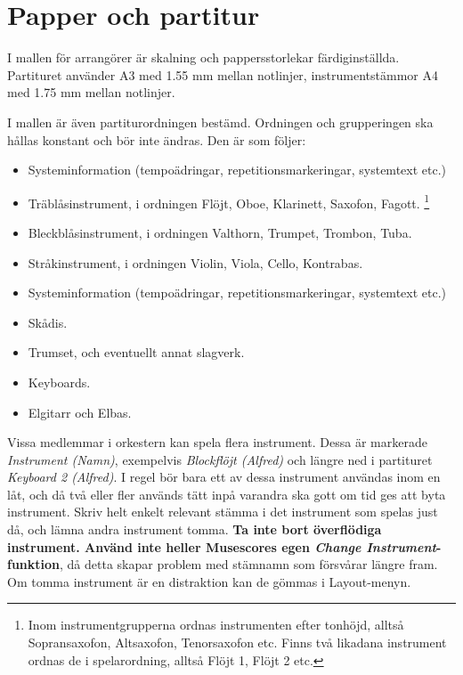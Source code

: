 \newpage
\section{Papper och partitur}
I mallen för arrangörer är skalning och pappersstorlekar färdiginställda. Partituret använder A3 med 1.55 mm mellan notlinjer, instrumentstämmor A4 med 1.75 mm mellan notlinjer. 

I mallen är även partiturordningen bestämd. Ordningen och grupperingen ska hållas konstant och bör inte ändras. Den är som följer:
\begin{itemize}
    \item Systeminformation (tempoädringar, repetitionsmarkeringar, systemtext etc.)
    \item Träblåsinstrument, i ordningen Flöjt, Oboe, Klarinett, Saxofon, Fagott. \footnote{\label{inom}Inom instrumentgrupperna ordnas instrumenten efter tonhöjd, alltså Sopransaxofon, Altsaxofon, Tenorsaxofon etc. Finns två likadana instrument ordnas de i spelarordning, alltså Flöjt 1, Flöjt 2 etc.}
    \item Bleckblåsinstrument, i ordningen Valthorn, Trumpet, Trombon, Tuba. 
    \item Stråkinstrument, i ordningen Violin, Viola, Cello, Kontrabas. 
    \item Systeminformation (tempoädringar, repetitionsmarkeringar, systemtext etc.)
    \item Skådis.
    \item Trumset, och eventuellt annat slagverk.
    \item Keyboards.
    \item Elgitarr och Elbas.
\end{itemize}

Vissa medlemmar i orkestern kan spela flera instrument. Dessa är markerade \textit{Instrument (Namn)}, exempelvis \textit{Blockflöjt (Alfred)} och längre ned i partituret \textit{Keyboard 2 (Alfred)}. I regel bör bara ett av dessa instrument användas inom en låt, och då två eller fler används tätt inpå varandra ska gott om tid ges att byta instrument. Skriv helt enkelt relevant stämma i det instrument som spelas just då, och lämna andra instrument tomma. \textbf{Ta inte bort överflödiga instrument. Använd inte heller Musescores egen \textit{Change Instrument}-funktion}, då detta skapar problem med stämnamn som försvårar längre fram. Om tomma instrument är en distraktion kan de gömmas i Layout-menyn.

